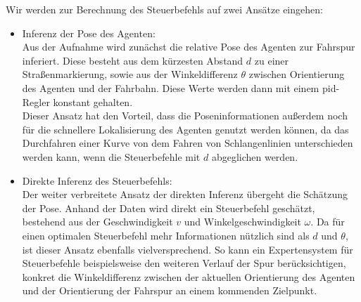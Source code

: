Wir werden zur Berechnung des Steuerbefehls auf zwei Ansätze eingehen:

\begin{itemize}
	\item Inferenz der Pose des Agenten:\\
	Aus der Aufnahme wird zunächst die relative Pose des Agenten zur Fahrspur inferiert. Diese besteht aus dem kürzesten Abstand $d$ zu einer Straßenmarkierung, sowie aus der Winkeldifferenz $\theta$ zwischen Orientierung des Agenten und der Fahrbahn. Diese Werte werden dann mit einem \acs{pid}-Regler konstant gehalten.\\
	Dieser Ansatz hat den Vorteil, dass die Poseninformationen außerdem noch für die schnellere Lokalisierung des Agenten genutzt werden können, da das Durchfahren einer Kurve von dem Fahren von Schlangenlinien unterschieden werden kann, wenn die Steuerbefehle mit $d$ abgeglichen werden.
	\item Direkte Inferenz des Steuerbefehls:\\
	Der weiter verbreitete Ansatz der direkten Inferenz übergeht die Schätzung der Pose. Anhand der Daten wird direkt ein Steuerbefehl geschätzt, bestehend aus der Geschwindigkeit $v$ und Winkelgeschwindigkeit $\omega$. Da für einen optimalen Steuerbefehl mehr Informationen nützlich sind als $d$ und $\theta$, ist dieser Ansatz ebenfalls vielversprechend. So kann ein Expertensystem für Steuerbefehle beispielsweise den weiteren Verlauf der Spur berücksichtigen, konkret die Winkeldifferenz zwischen der aktuellen Orientierung des Agenten und der Orientierung der Fahrspur an einem kommenden Zielpunkt.
\end{itemize}
